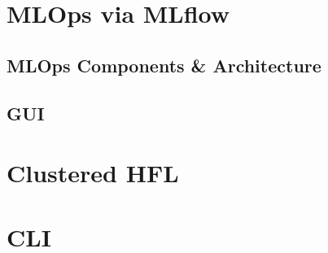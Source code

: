 \section{MLOps via MLflow}

    \subsection{MLOps Components \& Architecture}

    \subsection{GUI}

\section{Clustered HFL}

\section{CLI}

